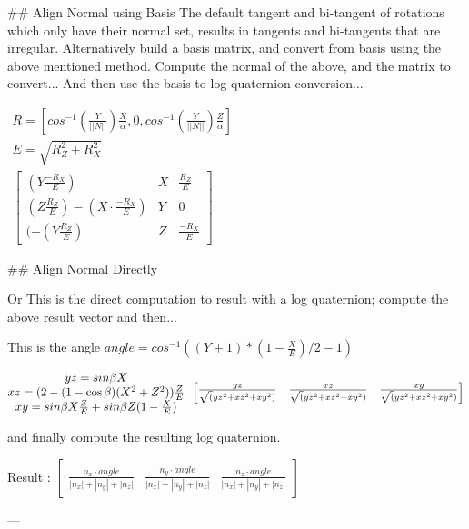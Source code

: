 ## Align Normal using Basis
The default tangent and bi-tangent of rotations which only have their normal set, results in tangents and bi-tangents that are irregular.  Alternatively build a basis matrix, and convert from basis using the above mentioned method. 
Compute the normal of the above, and the matrix to convert...
And then use the basis to log quaternion conversion...

$\begin{matrix}    R =  [      cos^{-1}( \frac Y {||N||} ) \frac X \alpha, 	0, cos^{-1}( \frac Y {||N||} ) \frac Z \alpha ] \\
	E = \sqrt { R_Z^2+R_X^2 } \\
\begin{bmatrix}
(Y  \frac {-R_X }{ E })&X&\frac {R_Z}{E} \\
 (Z  \frac {R_Z}{E})-(X \cdot \frac {-R_X }{ E } )&Y&0\\
 (-(Y  \frac {R_Z}{E} )&Z&\frac {-R_X }{ E }
\end{bmatrix}
\end{matrix}
$


## Align Normal Directly

Or This is the direct computation to result with a log quaternion; compute the above result vector and then...


This is the angle $angle = cos^{-1} ( ( Y + 1 ) * ( 1 - {\frac X E} ) / 2 - 1 ) $


$\begin{matrix}
        yz = sin \beta X \\
	xz = ( 2 - (1-\cos \beta) (X^2 + Z^2) )  {\frac Z E}\\
	xy = sin \beta  X {\frac Z E}   + sin \beta  Z  (1-{\frac X E})
\end{matrix} \\
 \begin{bmatrix}
                            \frac{yz}{\sqrt(yz^2 + xz^2 + xy^2)} &
							\frac{xz}{\sqrt(yz^2 + xz^2 + xy^2)} &
							\frac{xy}{\sqrt(yz^2 + xz^2 + xy^2)}
\end{bmatrix}                            
$

and finally compute the resulting log quaternion.

Result : $\begin{bmatrix}
  \frac{n_x \cdot angle}{|n_x| + |n_y| + |n_z| }&
  \frac{n_y \cdot angle}{|n_x| + |n_y| + |n_z| }&
  \frac{n_z \cdot angle}{|n_x| + |n_y| + |n_z| }
\end{bmatrix} $

---

